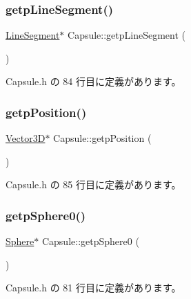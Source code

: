 \subsubsection{\texorpdfstring{getp\+Line\+Segment()}{getpLineSegment()}}
{\footnotesize\ttfamily \mbox{\hyperlink{class_line_segment}{Line\+Segment}}$\ast$ Capsule\+::getp\+Line\+Segment (\begin{DoxyParamCaption}{ }\end{DoxyParamCaption})\hspace{0.3cm}{\ttfamily [inline]}}



 Capsule.\+h の 84 行目に定義があります。

\mbox{\label{class_capsule_afc99a1883241c44d0bf5f4deb5f3cb92}} 
\subsubsection{\texorpdfstring{getp\+Position()}{getpPosition()}}
{\footnotesize\ttfamily \mbox{\hyperlink{class_vector3_d}{Vector3D}}$\ast$ Capsule\+::getp\+Position (\begin{DoxyParamCaption}{ }\end{DoxyParamCaption})\hspace{0.3cm}{\ttfamily [inline]}}



 Capsule.\+h の 85 行目に定義があります。

\mbox{\label{class_capsule_a21069589808b846bced97f00beb6d156}} 
\subsubsection{\texorpdfstring{getp\+Sphere0()}{getpSphere0()}}
{\footnotesize\ttfamily \mbox{\hyperlink{class_sphere}{Sphere}}$\ast$ Capsule\+::getp\+Sphere0 (\begin{DoxyParamCaption}{ }\end{DoxyParamCaption})\hspace{0.3cm}{\ttfamily [inline]}}



 Capsule.\+h の 81 行目に定義があります。

\mbox{\label{class_capsule_a5a1ee83c8ff8136d361864bcda8138ca}} 
